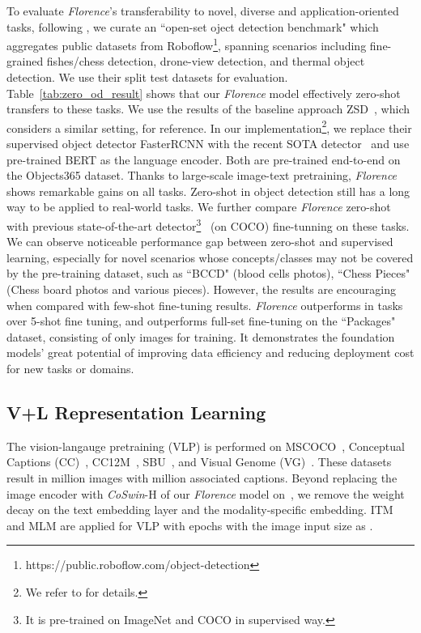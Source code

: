 \documentclass{article}
\begin{document}
To evaluate \emph{Florence}'s transferability to novel, diverse and application-oriented tasks, following \cite{harold_GLIP2021}, we curate an ``open-set oject detection benchmark" which aggregates   public datasets from
Roboflow\footnote{https://public.roboflow.com/object-detection}, spanning scenarios including fine-grained fishes/chess detection, drone-view detection, and thermal object detection. We use their split test datasets for evaluation. Table~\ref{tab:zero_od_result} shows that our \emph{Florence} model effectively zero-shot transfers to these tasks. We use the results of the baseline approach ZSD~\cite{bansal2018zero}, which considers a similar setting, for reference. In our implementation\footnote{We refer to \cite{harold_GLIP2021} for details.}, we replace their supervised object detector FasterRCNN with the recent SOTA detector~\cite{Dai_2021_CVPR} and use pre-trained BERT as the language encoder. Both are pre-trained end-to-end on the Objects365 dataset. Thanks to large-scale image-text pretraining, \emph{Florence} shows remarkable
gains on all tasks. Zero-shot in object detection still has a long way to be applied to
real-world tasks.
We further compare \emph{Florence} zero-shot with previous state-of-the-art
detector\footnote{It is pre-trained on ImageNet and COCO in supervised way.}~\cite{Dai_2021_CVPR} (on
COCO) fine-tunning on these tasks. We can observe noticeable performance gap between zero-shot and
supervised learning, especially for novel scenarios whose concepts/classes may not be covered by the pre-training dataset, such as ``BCCD" (blood cells photos), ``Chess Pieces" (Chess board photos and
various pieces). However, the results are  encouraging when compared with few-shot fine-tuning
results. \emph{Florence} outperforms in  tasks over 5-shot fine tuning, and outperforms full-set fine-tuning on the ``Packages" dataset, consisting of only  images for training. It demonstrates
the foundation models' great potential of improving data efficiency and reducing deployment cost for new tasks or domains.

\subsection{V+L Representation Learning}
The vision-langauge pretraining (VLP) is performed on
MSCOCO~\cite{lin2015microsoft}, Conceptual Captions (CC)~\cite{sharma2018conceptual},
CC12M~\cite{changpinyo2021cc12m},
SBU~\cite{OrdonezKB11}, and Visual Genome (VG)~\cite{krishnavisualgenome}.
These datasets result in  million images with  million associated captions.
Beyond replacing the image encoder with \emph{CoSwin}-H of
our \emph{Florence} model on~\cite{dou2021empirical}, we
remove the weight decay on the text embedding layer and
the modality-specific embedding.
ITM and MLM are applied for VLP with  epochs with the image input size as .
\end{document}
